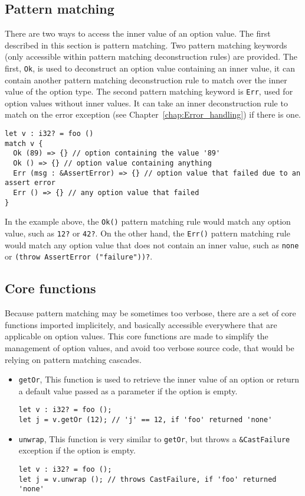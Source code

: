 \subsection{Pattern matching}

There are two ways to access the inner value of an option value. The first
described in this section is pattern matching. Two pattern matching keywords
(only accessible within pattern matching deconstruction rules) are provided. The
first, \texttt{Ok}, is used to deconstruct an option value containing an inner
value, it can contain another pattern matching deconstruction rule to match over
the inner value of the option type. The second pattern matching keyword is
\texttt{Err}, used for option values without inner values. It can take an inner
deconstruction rule to match on the error exception (see
Chapter~\ref{chap:Error_handling}) if there is one.

\begin{lstlisting}[style=coloredverbatim]
let v : i32? = foo ()
match v {
  Ok (89) => {} // option containing the value '89'
  Ok () => {} // option value containing anything
  Err (msg : &AssertError) => {} // option value that failed due to an assert error
  Err () => {} // any option value that failed
}
\end{lstlisting}

In the example above, the \texttt{Ok()} pattern matching rule would match any
option value, such as \texttt{12?} or \texttt{42?}. On the other hand, the
\texttt{Err()} pattern matching rule would match any option value that does not
contain an inner value, such as \texttt{none} or \texttt{(throw AssertError
  ("failure"))?}.

\subsection{Core functions}

Because pattern matching may be sometimes too verbose, there are a set of core
functions imported implicitely, and basically accessible everywhere that are
applicable on option values. This core functions are made to simplify the
management of option values, and avoid too verbose source code, that would be
relying on pattern matching cascades.

\begin{itemize}
\item \texttt{getOr}, This function is used to retrieve the inner value of an
  option or return a default value passed as a parameter if the option is empty.
  \begin{lstlisting}[style=coloredverbatim]
let v : i32? = foo ();
let j = v.getOr (12); // 'j' == 12, if 'foo' returned 'none'
  \end{lstlisting}
\item \texttt{unwrap}, This function is very similar to \texttt{getOr}, but
  throws a \texttt{\&CastFailure} exception if the option is empty.
  \begin{lstlisting}[style=coloredverbatim]
let v : i32? = foo ();
let j = v.unwrap (); // throws CastFailure, if 'foo' returned 'none'
  \end{lstlisting}
\end{itemize}

